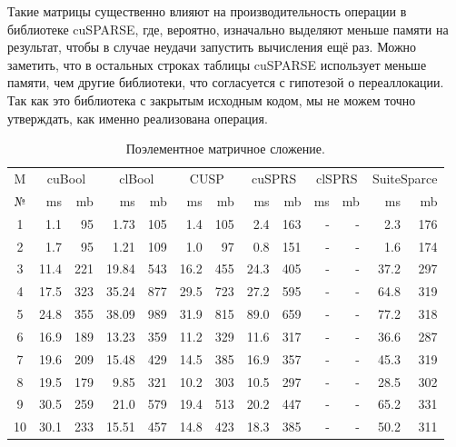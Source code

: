 \documentclass[14pt]{extarticle}
\begin{document}
	Такие матрицы существенно влияют на производительность операции в библиотеке cuSPARSE, где, вероятно, изначально выделяют меньше памяти на результат, чтобы в случае неудачи запустить вычисления ещё раз. Можно заметить, что в остальных строках таблицы cuSPARSE использует меньше памяти, чем другие библиотеки, что согласуется с гипотезой о переаллокации. Так как это библиотека с закрытым исходным кодом, мы не можем точно утверждать, как именно реализована операция.
	
		\begin{table}
		\centering
		\small
		\begin{tabular}{ |c|r r|r r|r r|r r|r r||r r|} 
			\hline
			M & \multicolumn{2}{c|}{cuBool} & \multicolumn{2}{c|}{clBool} & 
			\multicolumn{2}{c|}{CUSP} &  \multicolumn{2}{c|}{cuSPRS} & 
			\multicolumn{2}{c||}{clSPRS} & \multicolumn{2}{c|}{SuiteSparce}\\
			№ & ms  & mb &  ms  & mb  &  ms  & mb &  ms  & mb &  ms  & mb  &  ms  & mb \\
			\hline
			1 & 1.1 & 95 & 1.73 & 105 & 1.4 & 105 & 2.4 & 163 & - & - & 2.3 & 176 \\ %
			2 & 1.7 & 95 & 1.21  & 109 & 1.0  & 97 & 0.8 & 151 & -  & - & 1.6& 174 \\ %
			3 & 11.4 & 221 & 19.84  & 543 & 16.2 & 455 & 24.3 & 405 & - & - & 37.2 & 297 \\ %
			4 & 17.5 & 323 & 35.24  & 877 & 29.5 & 723 & 27.2 & 595 & - & - & 64.8 & 319 \\ %
			5 & 24.8 & 355 & 38.09  & 989 & 31.9 & 815 & 89.0 & 659 & - & - & 77.2 & 318 \\ %
			6 & 16.9 & 189 & 13.23  & 359 & 11.2 & 329 & 11.6 & 317 & - & - & 36.6 & 287 \\ %
			7 & 19.6 & 209 & 15.48  & 429 & 14.5 & 385 & 16.9 & 357 & - & - & 45.3 & 319 \\ %
			8 & 19.5 & 179 & 9.85  & 321 & 10.2 & 303 & 10.5 & 297 & - & - & 28.5 & 302 \\ %
			9 & 30.5 & 259 & 21.0  & 579 & 19.4 & 513 & 20.2 & 447 & - & - & 65.2 & 331 \\ %
			10 & 30.1 & 233 & 15.51  & 457 & 14.8 & 423 & 18.3 & 385 & -  & -   & 50.2 & 311 \\ %
			\hline
			
			
		\end{tabular}
		\caption{Поэлементное матричное сложение.}
		\label{table:add}
	\end{table}
	
\end{document}

